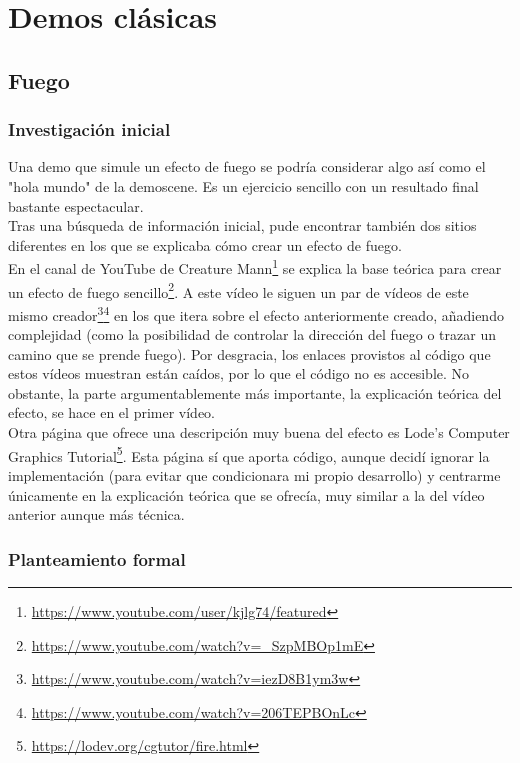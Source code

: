 \chapter{Demos clásicas}

\section{Fuego}

\subsection{Investigación inicial}

Una demo que simule un efecto de fuego se podría considerar algo así como el "hola mundo" de la demoscene. Es un ejercicio sencillo con un resultado final bastante espectacular.\\

Tras una búsqueda de información inicial, pude encontrar también dos sitios diferentes en los que se explicaba cómo crear un efecto de fuego.\\ 

En el canal de YouTube de Creature Mann\footnote{\url{https://www.youtube.com/user/kjlg74/featured}} se explica la base teórica para crear un efecto de fuego sencillo\footnote{\url{https://www.youtube.com/watch?v=_SzpMBOp1mE}}. A este vídeo le siguen un par de vídeos de este mismo creador\footnote{\url{https://www.youtube.com/watch?v=iezD8B1ym3w}}\footnote{\url{https://www.youtube.com/watch?v=206TEPBOnLc}} en los que itera sobre el efecto anteriormente creado, añadiendo complejidad (como la posibilidad de controlar la dirección del fuego o trazar un camino que se prende fuego). Por desgracia, los enlaces provistos al código que estos vídeos muestran están caídos, por lo que el código no es accesible. No obstante, la parte argumentablemente más importante, la explicación teórica del efecto, se hace en el primer vídeo.\\

Otra página que ofrece una descripción muy buena del efecto es Lode's Computer Graphics Tutorial\footnote{\url{https://lodev.org/cgtutor/fire.html}}. Esta página sí que aporta código, aunque decidí ignorar la implementación (para evitar que condicionara mi propio desarrollo) y centrarme únicamente en la explicación teórica que se ofrecía, muy similar a la del vídeo anterior aunque más técnica.\\

\subsection{Planteamiento formal}


